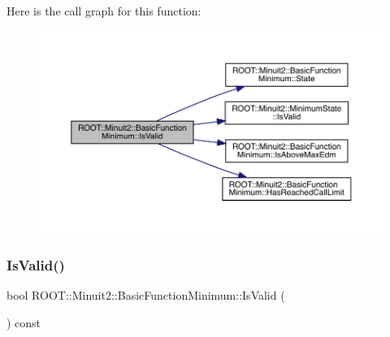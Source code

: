 Here is the call graph for this function\+:
\nopagebreak
\begin{figure}[H]
\begin{center}
\leavevmode
\includegraphics[width=350pt]{de/d25/classROOT_1_1Minuit2_1_1BasicFunctionMinimum_a644f34dabb94b0b5bdc8f7b8bfa7ae4b_cgraph}
\end{center}
\end{figure}
\mbox{\label{classROOT_1_1Minuit2_1_1BasicFunctionMinimum_a644f34dabb94b0b5bdc8f7b8bfa7ae4b}} 
\subsubsection{\texorpdfstring{IsValid()}{IsValid()}\hspace{0.1cm}{\footnotesize\ttfamily [2/3]}}
{\footnotesize\ttfamily bool R\+O\+O\+T\+::\+Minuit2\+::\+Basic\+Function\+Minimum\+::\+Is\+Valid (\begin{DoxyParamCaption}{ }\end{DoxyParamCaption}) const\hspace{0.3cm}{\ttfamily [inline]}}

